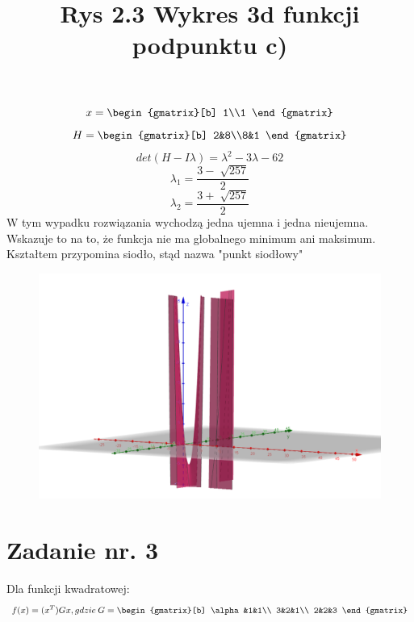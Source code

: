 \documentclass{article}
\begin{document}
\begin{equation}
  x=\begin{gmatrix}[b]
    1\\1
  \end{gmatrix}
\end{equation}
\begin{equation}
  H=\begin{gmatrix}[b]
    2&8\\8&1
  \end{gmatrix}
\end{equation}
\begin{equation}
  det(H-I\lambda)=\lambda^2-3\lambda-62
\end{equation}
\begin{equation}
  \lambda_1=\frac{3-\sqrt[]{257}}{2}
\end{equation}
\begin{equation}
  \lambda_2=\frac{3+\sqrt[]{257}}{2}
\end{equation}
W tym wypadku rozwiązania wychodzą jedna ujemna i jedna nieujemna. Wskazuje to na to, że funkcja nie ma globalnego minimum ani maksimum. Kształtem przypomina siodło, stąd nazwa "punkt siodłowy"
\begin{figure}[h]
  \includegraphics[scale=0.4]{Zadanie2c-wykres.png}
  \title{Rys 2.3 Wykres 3d funkcji podpunktu c)}
  \centering
\end{figure}
\newpage
\section{Zadanie nr. 3}
Dla funkcji kwadratowej:\\
\begin{equation}
  f(x) =   (x^T)Gx, gdzie \: G = \begin{gmatrix}[b]
    \alpha&1&1\\
    3&2&1\\
    2&2&3
  \end{gmatrix}
\end{equation}
\end{document}
